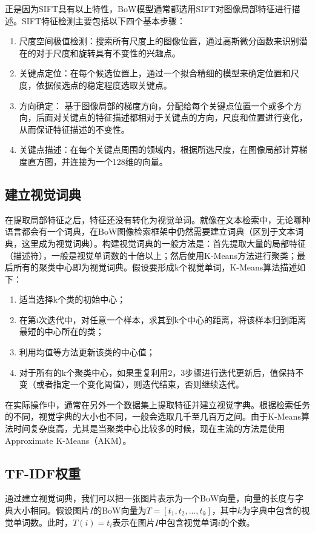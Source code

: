正是因为SIFT具有以上特性，BoW模型通常都选用SIFT对图像局部特征进行描述。SIFT特征检测主要包括以下四个基本步骤：
\begin{enumerate}
	\item 尺度空间极值检测：搜索所有尺度上的图像位置，通过高斯微分函数来识别潜在的对于尺度和旋转具有不变性的兴趣点。
	\item 关键点定位：在每个候选位置上，通过一个拟合精细的模型来确定位置和尺度，依据候选点的稳定程度选取关键点。
	\item 方向确定： 基于图像局部的梯度方向，分配给每个关键点位置一个或多个方向，后面对关键点的特征描述都相对于关键点的方向，尺度和位置进行变化，从而保证特征描述的不变性。
	\item 关键点描述：在每个关键点周围的领域内，根据所选尺度，在图像局部计算梯度直方图，并连接为一个128维的向量。
\end{enumerate}

\subsection{建立视觉词典}
在提取局部特征之后，特征还没有转化为视觉单词。就像在文本检索中，无论哪种语言都会有一个词典，在BoW图像检索框架中仍然需要建立词典（区别于文本词典，这里成为视觉词典）。构建视觉词典的一般方法是：首先提取大量的局部特征（描述符），一般是视觉单词数的十倍以上；然后使用K-Means方法进行聚类；最后所有的聚类中心即为视觉词典。假设要形成k个视觉单词，K-Means算法描述如下：
\begin{enumerate}
	\item 适当选择k个类的初始中心；
	\item 在第i次迭代中，对任意一个样本，求其到k个中心的距离，将该样本归到距离最短的中心所在的类；
	\item 利用均值等方法更新该类的中心值；
	\item 对于所有的k个聚类中心，如果重复利用2，3步骤进行迭代更新后，值保持不变（或者指定一个变化阈值），则迭代结束，否则继续迭代。
\end{enumerate}

在实际操作中，通常在另外一个数据集上提取特征并建立视觉字典。根据检索任务的不同，视觉字典的大小也不同，一般会选取几千至几百万之间。由于K-Means算法时间复杂度高，尤其是当聚类中心比较多的时候，现在主流的方法是使用Approximate K-Means（AKM）\cite{philbin2007object}。

\subsection{TF-IDF权重}
通过建立视觉词典，我们可以把一张图片表示为一个BoW向量，向量的长度与字典大小相同。假设图片$I$的BoW向量为$T=[t_1,t_2,...,t_k]$，其中$k$为字典中包含的视觉单词数。此时，$T(i)=t_i$表示在图片$I$中包含视觉单词$i$的个数。

